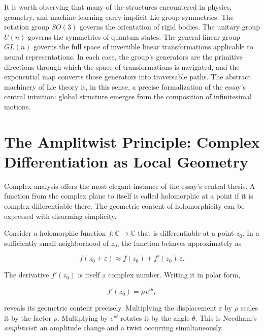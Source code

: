 \documentclass[11pt, a4paper]{article}
\theoremstyle{plain}
\theoremstyle{definition}
\theoremstyle{remark}
\begin{document}
It is worth observing that many of the structures encountered in physics, geometry, and
machine learning carry implicit Lie group symmetries. The rotation group $SO(3)$ governs
the orientation of rigid bodies. The unitary group $U(n)$ governs the symmetries of
quantum states. The general linear group $GL(n)$ governs the full space of invertible
linear transformations applicable to neural representations. In each case, the group's
generators are the primitive directions through which the space of transformations is
navigated, and the exponential map converts those generators into traversable paths.
The abstract machinery of Lie theory is, in this sense, a precise formalization of the
essay's central intuition: global structure emerges from the composition of infinitesimal
motions.


\section{The Amplitwist Principle: Complex Differentiation as Local Geometry}

Complex analysis offers the most elegant instance of the essay's central thesis.
A function from the complex plane to itself is called holomorphic at a point if it is
complex-differentiable there. The geometric content of holomorphicity can be expressed
with disarming simplicity.

Consider a holomorphic function $f : \mathbb{C} \to \mathbb{C}$ that is differentiable
at a point $z_0$. In a sufficiently small neighborhood of $z_0$, the function behaves
approximately as

\begin{equation}
f(z_0 + \varepsilon) \approx f(z_0) + f'(z_0)\,\varepsilon.
\label{eq:amplitwist}
\end{equation}

The derivative $f'(z_0)$ is itself a complex number. Writing it in polar form,

\begin{equation}
f'(z_0) = \rho\,e^{i\theta},
\label{eq:polar}
\end{equation}

reveals its geometric content precisely. Multiplying the displacement $\varepsilon$
by $\rho$ scales it by the factor $\rho$. Multiplying by $e^{i\theta}$ rotates it by
the angle $\theta$. This is Needham's \emph{amplitwist}: an amplitude change and a twist
occurring simultaneously.
\end{document}
